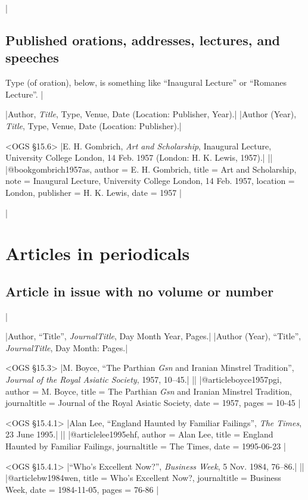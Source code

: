 \documentclass[extrafontsizes,11pt,a4paper,oneside]{memoir}
\begin{document}
\todoc|
\section{Published orations, addresses, lectures, and speeches}

Type (of oration), below, is something like \enquote{Inaugural Lecture} or \enquote{Romanes Lecture}.
|

\specs
|Author, \emph{Title}, Type, Venue, Date (Location: Publisher, Year).|%
|Author (Year), \emph{Title}, Type, Venue, Date (Location: Publisher).|

\bibexample<OGS \S15.6>
|E. H. Gombrich, \emph{Art and Scholarship}, Inaugural Lecture, University College London, 14 Feb. 1957 (London: H. K. Lewis, 1957).|%
||%
|@book{gombrich1957as,
  author = {E. H. Gombrich},
  title = {Art and Scholarship},
  note = {Inaugural Lecture, University College London, 14 Feb. 1957},
  location = {London},
  publisher = {H. K. Lewis},
  date = {1957}
}|

\todoc|
\chapter{Articles in periodicals}\label{sec:article}

\section{Article in issue with no volume or number}
|

\specs
|Author, \enquote{Title}, \emph{JournalTitle}, Day Month Year, Pages.|%
|Author (Year), \enquote{Title}, \emph{JournalTitle}, Day Month: Pages.|

\bibexample<OGS \S15.3>
|M. Boyce, \enquote{The Parthian \emph{Gsn} and Iranian Minstrel Tradition}, \emph{Journal of the Royal Asiatic Society}, 1957, 10--45.|%
||%
|@article{boyce1957pgi,
  author = {M. Boyce},
  title = {The Parthian \emph{Gsn} and Iranian Minstrel Tradition},
  journaltitle = {Journal of the Royal Asiatic Society},
  date = {1957},
  pages = {10-45}
}|

\bibexample<OGS \S15.4.1>
|Alan Lee, \enquote{England Haunted by Familiar Failings}, \emph{The Times}, 23 June 1995.|%
||%
|@article{lee1995ehf,
  author = {Alan Lee},
  title = {England Haunted by Familiar Failings},
  journaltitle = {The Times},
  date = {1995-06-23}
}|

\bibexample<OGS \S15.4.1>
|\enquote{Who's Excellent Now?}, \emph{Business Week}, 5 Nov. 1984, 76--86.|%
||%
|@article{bw1984wen,
  title = {Who's Excellent Now?},
  journaltitle = {Business Week},
  date = {1984-11-05},
  pages = {76-86}
}|
\end{document}
